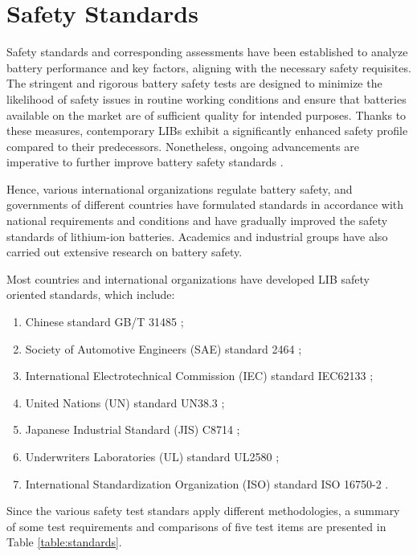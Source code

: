 \section{Safety Standards}
\label{sec:safety-standards}
Safety standards and corresponding assessments have been established to analyze battery performance and key factors, aligning with the necessary safety requisites. The stringent and rigorous battery safety tests are designed to minimize the likelihood of safety issues in routine working conditions and ensure that batteries available on the market are of sufficient quality for intended purposes. Thanks to these measures, contemporary LIBs exhibit a significantly enhanced safety profile compared to their predecessors. Nonetheless, ongoing advancements are imperative to further improve battery safety standards \cite{chen2021review}.

Hence, various international organizations regulate battery safety, and governments of different countries have formulated standards in accordance with national requirements and conditions and have gradually improved the safety standards of lithium-ion batteries. Academics and industrial groups have also carried out extensive research on battery safety.

Most countries and international organizations have developed LIB safety oriented standards, which include:
\begin{enumerate}
    \item Chinese standard GB/T 31485 \cite{GBT31485};
    \item Society of Automotive Engineers (SAE) standard 2464 \cite{SAE2464};
    \item International Electrotechnical Commission (IEC) standard IEC62133 \cite{IEC62133-2};
    \item United Nations (UN) standard UN38.3 \cite{UN38.3};
    \item Japanese Industrial Standard (JIS) C8714 \cite{JISC8714};
    \item Underwriters Laboratories (UL) standard UL2580 \cite{UL2580};
    \item International Standardization Organization (ISO) standard ISO 16750-2 \cite{ISO16750-2:2023}.
\end{enumerate}

Since the various safety test standars apply different methodologies, a summary of some test requirements and comparisons of five test items are presented in Table \ref{table:standards}.

